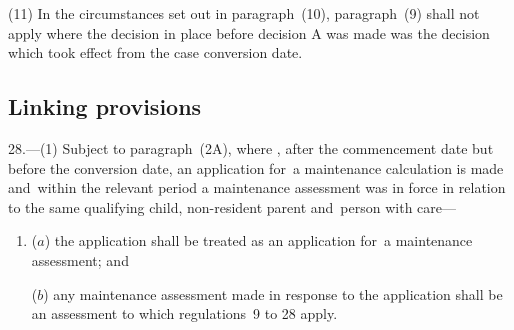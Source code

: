 \documentclass[12pt,a4paper]{article}
\begin{document}
(11) In the circumstances set out in paragraph~(10), paragraph~(9) shall not apply where the decision in place before decision A was made was the decision which took effect from the case conversion date.


\subsection[28. Linking provisions]{Linking provisions}

28.---(1)  
Subject to paragraph~(2A), where%
, after the commencement date but before the conversion date, an application for~a maintenance calculation is made 
and~within the relevant period a maintenance assessment was in force in relation to the same qualifying child, non-resident parent and~person with care—
\begin{enumerate}\item[]
($a$) the application shall be treated as an application for~a maintenance assessment; and

($b$) any maintenance assessment made in response to the application shall be an assessment to which regulations~9 to 28 apply.
\end{enumerate}
\end{document}
